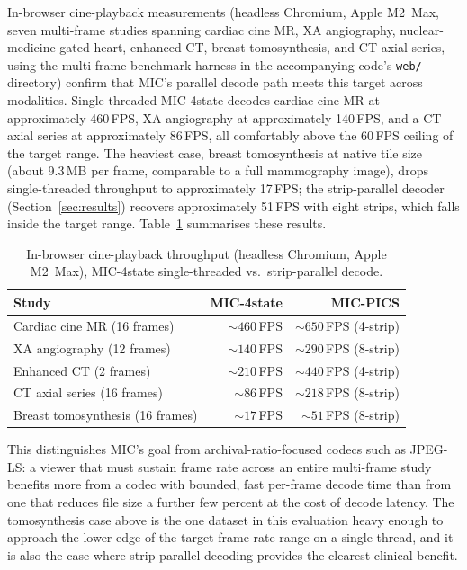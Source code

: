 \documentclass[journal]{IEEEtran}
\begin{document}
In-browser cine-playback measurements (headless Chromium, Apple M2~Max,
seven multi-frame studies spanning cardiac cine MR, XA angiography,
nuclear-medicine gated heart, enhanced CT, breast tomosynthesis, and CT axial
series, using the multi-frame benchmark harness in the accompanying code's
\texttt{web/} directory) confirm that MIC's parallel decode path meets this
target across modalities. Single-threaded MIC-4state decodes cardiac cine MR
at approximately 460\,FPS, XA angiography at approximately 140\,FPS, and a CT
axial series at approximately 86\,FPS, all comfortably above the 60\,FPS
ceiling of the target range. The heaviest case, breast tomosynthesis at
native tile size (about 9.3\,MB per frame, comparable to a full mammography
image), drops single-threaded throughput to approximately 17\,FPS; the
strip-parallel decoder (Section~\ref{sec:results}) recovers approximately
51\,FPS with eight strips, which falls inside the target range.
Table~\ref{tab:cine} summarises these results.

\begin{table}[htbp]
\centering
\caption{In-browser cine-playback throughput (headless Chromium, Apple
M2~Max), MIC-4state single-threaded vs.\ strip-parallel decode.}
\label{tab:cine}
\scriptsize
\begin{tabular}{lrr}
\toprule
Study & MIC-4state & MIC-PICS \\
\midrule
Cardiac cine MR (16 frames)      & ${\sim}460$\,FPS & ${\sim}650$\,FPS (4-strip) \\
XA angiography (12 frames)       & ${\sim}140$\,FPS & ${\sim}290$\,FPS (8-strip) \\
Enhanced CT (2 frames)           & ${\sim}210$\,FPS & ${\sim}440$\,FPS (4-strip) \\
CT axial series (16 frames)      & ${\sim}86$\,FPS  & ${\sim}218$\,FPS (8-strip) \\
Breast tomosynthesis (16 frames) & ${\sim}17$\,FPS  & ${\sim}51$\,FPS (8-strip) \\
\bottomrule
\end{tabular}
\end{table}

This distinguishes MIC's goal from archival-ratio-focused codecs such as
JPEG-LS: a viewer that must sustain frame rate across an entire multi-frame
study benefits more from a codec with bounded, fast per-frame decode time than
from one that reduces file size a further few percent at the cost of decode
latency. The tomosynthesis case above is the one dataset in this evaluation
heavy enough to approach the lower edge of the target frame-rate range on a
single thread, and it is also the case where strip-parallel decoding provides
the clearest clinical benefit.
\end{document}

